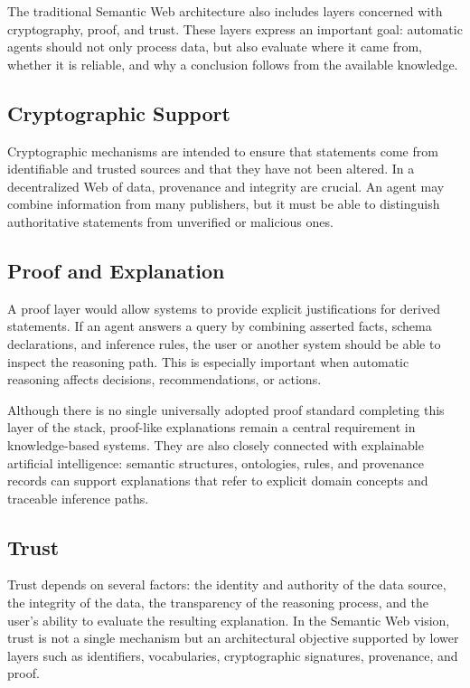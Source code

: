 \documentclass{scrbook}
\begin{document}
	The traditional Semantic Web architecture also includes layers concerned with cryptography, proof, and trust. These layers express an important goal: automatic agents should not only process data, but also evaluate where it came from, whether it is reliable, and why a conclusion follows from the available knowledge.
	
	\subsection{Cryptographic Support}
	
	Cryptographic mechanisms are intended to ensure that statements come from identifiable and trusted sources and that they have not been altered. In a decentralized Web of data, provenance and integrity are crucial. An agent may combine information from many publishers, but it must be able to distinguish authoritative statements from unverified or malicious ones.
	
	\subsection{Proof and Explanation}
	
	A proof layer would allow systems to provide explicit justifications for derived statements. If an agent answers a query by combining asserted facts, schema declarations, and inference rules, the user or another system should be able to inspect the reasoning path. This is especially important when automatic reasoning affects decisions, recommendations, or actions.
	
	Although there is no single universally adopted proof standard completing this layer of the stack, proof-like explanations remain a central requirement in knowledge-based systems. They are also closely connected with explainable artificial intelligence: semantic structures, ontologies, rules, and provenance records can support explanations that refer to explicit domain concepts and traceable inference paths.
	
	\subsection{Trust}
	
	Trust depends on several factors: the identity and authority of the data source, the integrity of the data, the transparency of the reasoning process, and the user's ability to evaluate the resulting explanation. In the Semantic Web vision, trust is not a single mechanism but an architectural objective supported by lower layers such as identifiers, vocabularies, cryptographic signatures, provenance, and proof.
	
\end{document}
